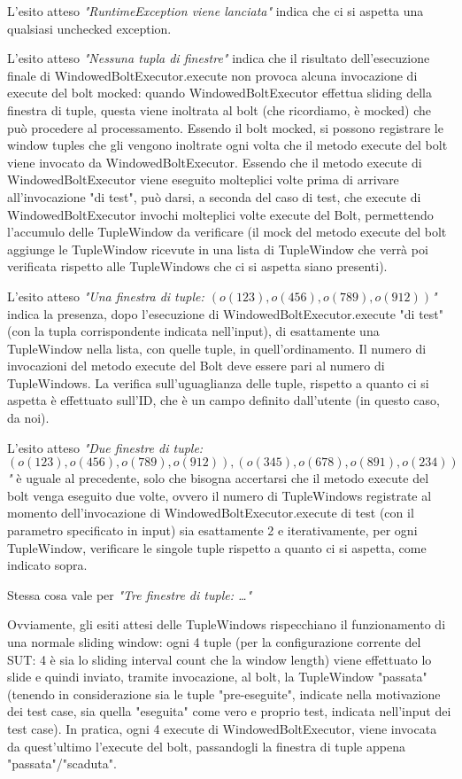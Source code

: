 \documentclass[10pt, a4paper]{article}
\begin{document}
	L'esito atteso \textit{"RuntimeException viene lanciata"} indica che ci si aspetta una qualsiasi unchecked exception.
	
	L'esito atteso \textit{"Nessuna tupla di finestre"} indica che il risultato dell'esecuzione finale di 
	WindowedBoltExecutor.execute non provoca alcuna invocazione di execute del bolt mocked: quando WindowedBoltExecutor effettua
	sliding della finestra di tuple, questa viene inoltrata al bolt (che ricordiamo, è mocked) che può procedere al processamento.
	Essendo il bolt mocked, si possono registrare le window tuples che gli vengono inoltrate ogni volta che il metodo execute
	del bolt viene invocato da WindowedBoltExecutor. Essendo che il metodo execute di WindowedBoltExecutor viene eseguito 
	molteplici volte prima di arrivare all'invocazione "di test", può darsi, a seconda del caso di test, 
	che execute di WindowedBoltExecutor invochi molteplici volte execute del Bolt, permettendo l'accumulo delle TupleWindow da
	verificare (il mock del metodo execute del bolt aggiunge le TupleWindow ricevute in una lista di TupleWindow che verrà poi
	verificata rispetto alle TupleWindows che ci si aspetta siano presenti).
	
	L'esito atteso \textit{"Una finestra di tuple: $(o(123),o(456),o(789),o(912))$"} indica la presenza, dopo l'esecuzione
	di WindowedBoltExecutor.execute "di test" (con la tupla corrispondente indicata nell'input), 
	di esattamente una TupleWindow nella lista,
	con quelle tuple, in quell'ordinamento. Il numero di invocazioni del metodo execute del Bolt deve essere pari al numero di
	TupleWindows. La verifica sull'uguaglianza delle tuple, rispetto a quanto ci si aspetta è effettuato sull'ID, 
	che è un campo definito dall'utente (in questo caso, da noi).
	
	L'esito atteso \textit{"Due finestre di tuple: $(o(123),o(456),o(789),o(912)),(o(345),o(678),o(891),o(234))$"} è uguale
	al precedente, solo che bisogna accertarsi che il metodo execute del bolt venga eseguito due volte, ovvero il numero di 
	TupleWindows registrate al momento dell'invocazione di WindowedBoltExecutor.execute di test (con il parametro specificato
	in input) sia esattamente 2 e iterativamente, per ogni TupleWindow, verificare le singole tuple rispetto a quanto ci si
	aspetta, come indicato sopra.
	
	Stessa cosa vale per \textit{"Tre finestre di tuple: \dots"}
	
	Ovviamente, gli esiti attesi delle TupleWindows rispecchiano il funzionamento di una normale sliding window: ogni
	4 tuple (per la configurazione corrente del SUT: 4 è sia lo sliding interval count che la window length) 
	viene effettuato lo slide e quindi inviato, tramite invocazione, al bolt, la TupleWindow "passata" (tenendo in
	considerazione sia le tuple "pre-eseguite", indicate nella motivazione dei test case, 
	sia quella "eseguita" come vero e proprio test, indicata nell'input dei test case). 
	In pratica, ogni 4 execute di WindowedBoltExecutor, viene invocata da quest'ultimo l'execute del bolt,
	passandogli la finestra di tuple appena "passata"/"scaduta".
	
\end{document}
